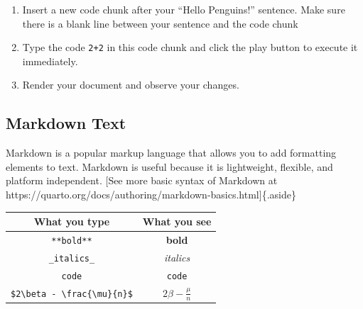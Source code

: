 \documentclass[
  letterpaper,
  DIV=11,
  numbers=noendperiod,
  oneside]{scrreprt}
\providecommand{\tightlist}{%
  \setlength{\itemsep}{0pt}\setlength{\parskip}{0pt}}\usepackage{longtable,booktabs,array}
\begin{document}
\begin{tcolorbox}[enhanced jigsaw, bottomrule=.15mm, colback=white, colframe=quarto-callout-tip-color-frame, toprule=.15mm, coltitle=black, rightrule=.15mm, opacitybacktitle=0.6, colbacktitle=quarto-callout-tip-color!10!white, toptitle=1mm, leftrule=.75mm, breakable, bottomtitle=1mm, titlerule=0mm, title={👉 Add some code}, arc=.35mm, left=2mm, opacityback=0]

\begin{enumerate}
\def\labelenumi{\arabic{enumi}.}
\tightlist
\item
  Insert a new code chunk after your ``Hello Penguins!'' sentence. Make
  sure there is a blank line between your sentence and the code chunk
\item
  Type the code \texttt{2+2} in this code chunk and click the play
  button to execute it immediately.\\
\item
  Render your document and observe your changes.
\end{enumerate}

\end{tcolorbox}

\subsection{Markdown Text}\label{sec-markdown}

Markdown is a popular markup language that allows you to add formatting
elements to text. Markdown is useful because it is lightweight,
flexible, and platform independent. {[}See more basic syntax of Markdown
at https://quarto.org/docs/authoring/markdown-basics.html{]}\{.aside\}

\begin{longtable}[]{@{}cc@{}}
\toprule\noalign{}
What you type & What you see \\
\midrule\noalign{}
\endhead
\bottomrule\noalign{}
\endlastfoot
\texttt{**bold**} & \textbf{bold} \\
\texttt{\_italics\_} & \emph{italics} \\
\texttt{\textasciigrave{}code\textasciigrave{}} & \texttt{code} \\
\texttt{\$2\textbackslash{}beta\ -\ \textbackslash{}frac\{\textbackslash{}mu\}\{n\}\$}
& \(2\beta - \frac{\mu}{n}\) \\
\end{longtable}
\end{document}
